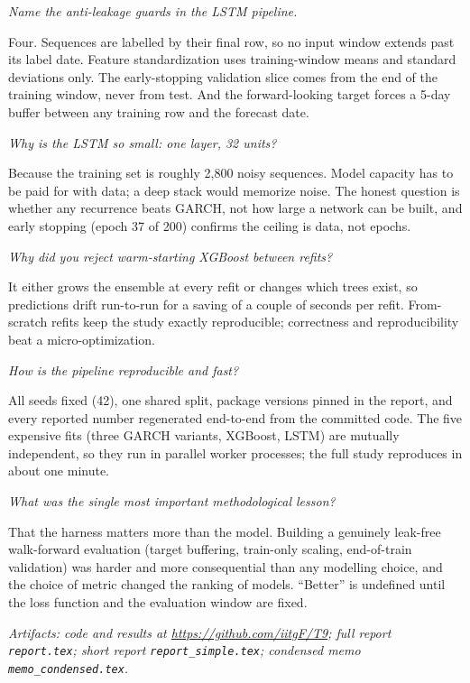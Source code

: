 \documentclass[a4paper,11pt]{article}
\newenvironment{qa}{\begin{description}[leftmargin=0pt,itemsep=6pt]}{\end{description}}
\newcommand{\Q}[1]{\item[Q.] \textit{#1}}
\newcommand{\A}{\item[A.]}
\begin{document}
\begin{qa}
\Q{Name the anti-leakage guards in the LSTM pipeline.}
\A Four. Sequences are labelled by their final row, so no input window extends past its label date. Feature standardization uses training-window means and standard deviations only. The early-stopping validation slice comes from the end of the training window, never from test. And the forward-looking target forces a 5-day buffer between any training row and the forecast date.

\Q{Why is the LSTM so small: one layer, 32 units?}
\A Because the training set is roughly 2{,}800 noisy sequences. Model capacity has to be paid for with data; a deep stack would memorize noise. The honest question is whether any recurrence beats GARCH, not how large a network can be built, and early stopping (epoch 37 of 200) confirms the ceiling is data, not epochs.

\Q{Why did you reject warm-starting XGBoost between refits?}
\A It either grows the ensemble at every refit or changes which trees exist, so predictions drift run-to-run for a saving of a couple of seconds per refit. From-scratch refits keep the study exactly reproducible; correctness and reproducibility beat a micro-optimization.

\Q{How is the pipeline reproducible and fast?}
\A All seeds fixed (42), one shared split, package versions pinned in the report, and every reported number regenerated end-to-end from the committed code. The five expensive fits (three GARCH variants, XGBoost, LSTM) are mutually independent, so they run in parallel worker processes; the full study reproduces in about one minute.

\Q{What was the single most important methodological lesson?}
\A That the harness matters more than the model. Building a genuinely leak-free walk-forward evaluation (target buffering, train-only scaling, end-of-train validation) was harder and more consequential than any modelling choice, and the choice of metric changed the ranking of models. ``Better'' is undefined until the loss function and the evaluation window are fixed.
\end{qa}

\vspace{4mm}
\noindent\textit{Artifacts: code and results at \url{https://github.com/iitgF/T9}; full report \texttt{report.tex}; short report \texttt{report\_simple.tex}; condensed memo \texttt{memo\_condensed.tex}.}
\end{document}
